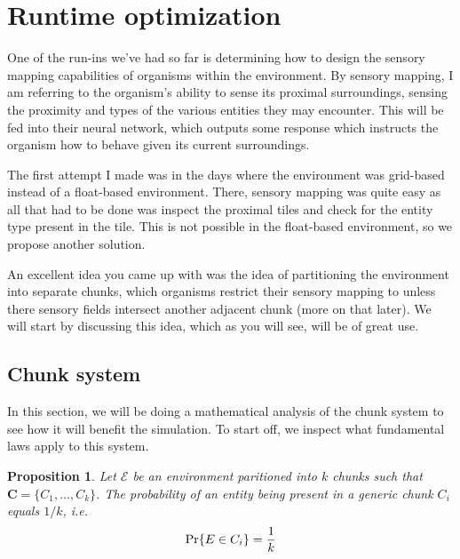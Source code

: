 \documentclass[a4paper, 12pt]{report}
\newtheorem{proposition}{Proposition}[chapter]
\theoremstyle{definition}
\begin{document}
\section{Runtime optimization}
One of the run-ins we've had so far is determining how to design the sensory mapping capabilities of organisms within the environment. By sensory mapping, I am referring to the organism's ability to sense its
proximal surroundings, sensing the proximity and types of the various entities they may encounter. This will be fed into their neural network, which outputs some response which instructs the organism how to behave
given its current surroundings.
\par The first attempt I made was in the days where the environment was grid-based instead of a float-based environment. There, sensory mapping was quite easy as all that had to be done was inspect the proximal tiles
and check for the entity type present in the tile. This is not possible in the float-based environment, so we propose another solution.
\par An excellent idea you came up with was the idea of partitioning the environment into separate chunks, which organisms restrict their sensory mapping to unless there sensory fields intersect another adjacent chunk
(more on that later). We will start by discussing this idea, which as you will see, will be of great use.

\subsection{Chunk system}
In this section, we will be doing a mathematical analysis of the chunk system to see how it will benefit the simulation. To start off, we inspect what fundamental laws apply to this system.

\begin{proposition}
    Let $\mathscr E$ be an environment paritioned into $k$ chunks such that $\mathbf C = \{C_1, \ldots, C_k\}$. The probability of an entity being present in a generic chunk $C_i$ equals $1/k$, i.e.
    \[
        \textnormal{Pr}\{E \in C_i\} = \frac 1k
    \]
\end{proposition}
\end{document}
